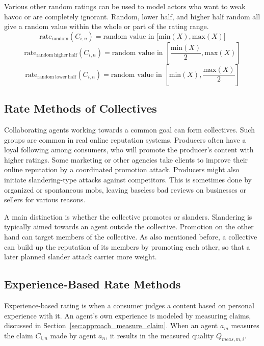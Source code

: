 \documentclass[%
    ]{\PathToTumTemplate/thesis/tum_thesis}
\begin{document}
Various other random ratings can be used to model actors who want to weak havoc or are completely ignorant.
Random, lower half, and higher half random all give a random value within the whole or part of the rating range.
\begin{equation}\label{eq:rate_random}
\mathrm{rate_{random}}(C_{i,n}) = \text{random value in $\big[\mathrm{min}(X), \mathrm{max}(X)\big]$}
\end{equation}
\begin{equation}\label{eq:rate_random_higher_half}
\mathrm{rate_{random~higher~half}}(C_{i,n}) = \text{random value in $\left[\frac{\mathrm{min}(X)}{2}, \mathrm{max}(X)\right]$}
\end{equation}
\begin{equation}\label{eq:rate_random_lower_half}
\mathrm{rate_{random~lower~half}}(C_{i,n}) = \text{random value in $\left[\mathrm{min}(X), \frac{\mathrm{max}(X)}{2}\right]$}
\end{equation}


\subsection{Rate Methods of Collectives}
Collaborating agents working towards a common goal can form collectives.
Such groups are common in real online reputation systems.
Producers often have a loyal following among consumers, who will promote the producer's content with higher ratings.
Some marketing or other agencies take clients to improve their online reputation by a coordinated promotion attack.
Producers might also initiate slandering-type attacks against competitors.
This is sometimes done by organized or spontaneous mobs, leaving baseless bad reviews on businesses or sellers for various reasons.

A main distinction is whether the collective promotes or slanders.
Slandering is typically aimed towards an agent outside the collective.
Promotion on the other hand can target members of the collective.
As also mentioned before, a collective can build up the reputation of its members by promoting each other, so that a later planned slander attack carrier more weight.

\subsection{Experience-Based Rate Methods}
Experience-based rating is when a consumer judges a content based on personal experience with it.
An agent's own experience is modeled by measuring claims, discussed in Section~\ref{sec:approach_measure_claim}.
When an agent $a_m$ measures the claim $C_{i,n}$ made by agent $a_n$, it results in the measured quality $Q_{meas,m,i}$.
\end{document}
